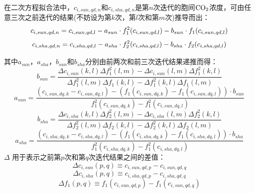 在二次方程拟合法中，$c_{i,sun,qd,n}$和$c_{i,sha,qd,n}$是第$n$次迭代的胞间$\rm CO_2$浓度，可由任意三次之前迭代的结果(不妨设为第$k$次，第$l$次和第$m$次)推导而出：
\begin{equation}\label{cisunq}
c_{i,sun,qd,n} =c_{i,sun,qd,l} \\
  -a_{sun}\cdot f^2_{1}(c_{i,sun,qd,l}) - b_{sun}\cdot f_{1}(c_{i,sun,qd,l})
\end{equation}
\begin{equation}\label{cishaq}
c_{i,sha,qd,n} =c_{i,sha,qd,l} \\
  -a_{sha}\cdot f^2_{2}(c_{i,sha,qd,l}) - b_{sha}\cdot f_{2}(c_{i,sha,qd,l})
\end{equation}

其中$a_{sun}$，$a_{sha}$，$b_{sun}$和$b_{sha}$分别由前两次和前三次迭代结果递推而得：
\begin{equation}\label{iterbsun}
b_{sun} = \frac{\Delta c_{i,sun}\left(k,l\right)\Delta f^2_1\left(l,m\right)-\Delta c_{i,sun}(l,m) \Delta f^2_1\left(k,l\right)}{\Delta f^2_1\left(l,m\right) \Delta f_1 \left(k,l\right)-\Delta f^2_1\left(k,l\right)\Delta f_1 \left(l,m\right)}
\end{equation}
\begin{equation}\label{iterasun}
a_{sun} = \frac{\left(c_{i,sun,dq,k}-c_{i,sun,dq,l}\right)-\left(f_1(c_{i,sun,dq,k})-f_1(c_{i,sun,dq,l})\right)\cdot b_{sun}}{f^2_1(c_{i,sun,dq,k})-f^2_1(c_{i,sun,dq,l})}
\end{equation}
\begin{equation}\label{iterbsha}
b_{sha} = \frac{\Delta c_{i,sha}\left(k,l\right)\Delta f^2_2\left(l,m\right)-\Delta c_{i,sha}(l,m) \Delta f^2_2\left(k,l\right)}{\Delta f^2_2\left(l,m\right) \Delta f_2 \left(k,l\right)-\Delta f^2_2\left(k,l\right)\Delta f_2 \left(l,m\right)}
\end{equation}
\begin{equation}\label{iterasha}
a_{sha} = \frac{\left(c_{i,sha,dq,k}-c_{i,sha,dq,l}\right)-\left(f_1(c_{i,sha,dq,k})-f_1(c_{i,sha,dq,l})\right)\cdot b_{sha}}{f^2_1(c_{i,sha,dq,k})-f^2_1(c_{i,sha,dq,l})}
\end{equation}
$\Delta$ 用于表示之前第$p$次和第$q$次迭代结果之间的差值：
\begin{equation}
\Delta c_{i,sun}(p,q)\equiv c_{i,sun,qd,p} - c_{i,sun,qd,q} 
\end{equation}
\begin{equation}
\Delta c_{i,sha}(p,q)\equiv c_{i,sha,qd,p} - c_{i,sha,qd,q} 
\end{equation}
\begin{equation}
\Delta f_1 \left(p,q\right)\equiv f_1(c_{i,sun,qd,p})-f_1(c_{i,sun,qd,q})
\end{equation}
